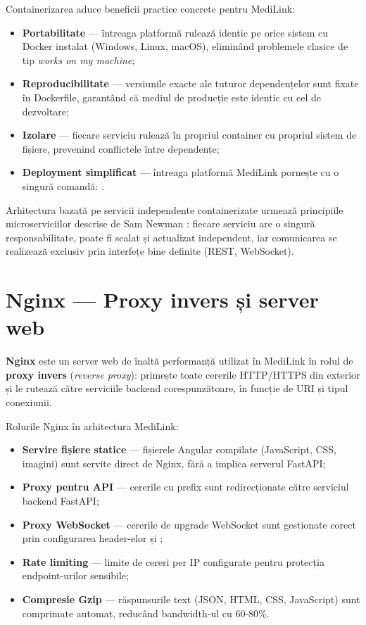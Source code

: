 Containerizarea aduce beneficii practice concrete pentru MediLink:
\begin{itemize}
  \item \textbf{Portabilitate} --- întreaga platformă rulează identic pe orice sistem cu Docker instalat (Windows, Linux, macOS), eliminând problemele clasice de tip \textit{works on my machine};
  \item \textbf{Reproducibilitate} --- versiunile exacte ale tuturor dependențelor sunt fixate în Dockerfile, garantând că mediul de producție este identic cu cel de dezvoltare;
  \item \textbf{Izolare} --- fiecare serviciu rulează în propriul container cu propriul sistem de fișiere, prevenind conflictele între dependențe;
  \item \textbf{Deployment simplificat} --- întreaga platformă MediLink pornește cu o singură comandă: .
\end{itemize}

Arhitectura bazată pe servicii independente containerizate urmează principiile microserviciilor descrise de Sam Newman \cite{newman2021microservices}: fiecare serviciu are o singură responsabilitate, poate fi scalat și actualizat independent, iar comunicarea se realizează exclusiv prin interfețe bine definite (REST, WebSocket).

\section{Nginx --- Proxy invers și server web}

\textbf{Nginx} \cite{nginx2024} este un server web de înaltă performanță utilizat în MediLink în rolul de \textbf{proxy invers} (\textit{reverse proxy}): primește toate cererile HTTP/HTTPS din exterior și le rutează către serviciile backend corespunzătoare, în funcție de URI și tipul conexiunii.

Rolurile Nginx în arhitectura MediLink:
\begin{itemize}
  \item \textbf{Servire fișiere statice} --- fișierele Angular compilate (JavaScript, CSS, imagini) sunt servite direct de Nginx, fără a implica serverul FastAPI;
  \item \textbf{Proxy pentru API} --- cererile cu prefix  sunt redirecționate către serviciul backend FastAPI;
  \item \textbf{Proxy WebSocket} --- cererile de upgrade WebSocket sunt gestionate corect prin configurarea header-elor  și ;
  \item \textbf{Rate limiting} --- limite de cereri per IP configurate pentru protecția endpoint-urilor sensibile;
  \item \textbf{Compresie Gzip} --- răspunsurile text (JSON, HTML, CSS, JavaScript) sunt comprimate automat, reducând bandwidth-ul cu 60-80\%.
\end{itemize}

